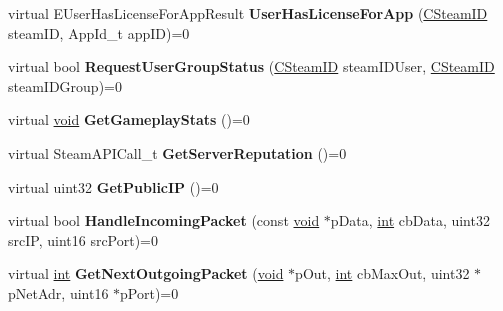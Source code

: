 \begin{DoxyCompactItemize}
\item 
\hypertarget{classISteamGameServer_add3a59d9012302094cf0fa6e58df68b9}{}virtual E\+User\+Has\+License\+For\+App\+Result {\bfseries User\+Has\+License\+For\+App} (\hyperlink{classCSteamID}{C\+Steam\+I\+D} steam\+I\+D, App\+Id\+\_\+t app\+I\+D)=0\label{classISteamGameServer_add3a59d9012302094cf0fa6e58df68b9}

\item 
\hypertarget{classISteamGameServer_a26660da8b7897075ac8d45b6c60a5fab}{}virtual bool {\bfseries Request\+User\+Group\+Status} (\hyperlink{classCSteamID}{C\+Steam\+I\+D} steam\+I\+D\+User, \hyperlink{classCSteamID}{C\+Steam\+I\+D} steam\+I\+D\+Group)=0\label{classISteamGameServer_a26660da8b7897075ac8d45b6c60a5fab}

\item 
\hypertarget{classISteamGameServer_a8700f90d3c1b911978db600d3f34c3db}{}virtual \hyperlink{SDL__audio_8h_a52835ae37c4bb905b903cbaf5d04b05f}{void} {\bfseries Get\+Gameplay\+Stats} ()=0\label{classISteamGameServer_a8700f90d3c1b911978db600d3f34c3db}

\item 
\hypertarget{classISteamGameServer_aea1658bc505a5caf2d9bd2c725bb0839}{}virtual Steam\+A\+P\+I\+Call\+\_\+t {\bfseries Get\+Server\+Reputation} ()=0\label{classISteamGameServer_aea1658bc505a5caf2d9bd2c725bb0839}

\item 
\hypertarget{classISteamGameServer_af47eae625782ed0d11e51c58774e5e6a}{}virtual uint32 {\bfseries Get\+Public\+I\+P} ()=0\label{classISteamGameServer_af47eae625782ed0d11e51c58774e5e6a}

\item 
\hypertarget{classISteamGameServer_a8923da7ae2b7a1cc178ec81f4f2d6cba}{}virtual bool {\bfseries Handle\+Incoming\+Packet} (const \hyperlink{SDL__audio_8h_a52835ae37c4bb905b903cbaf5d04b05f}{void} $\ast$p\+Data, \hyperlink{SDL__thread_8h_a6a64f9be4433e4de6e2f2f548cf3c08e}{int} cb\+Data, uint32 src\+I\+P, uint16 src\+Port)=0\label{classISteamGameServer_a8923da7ae2b7a1cc178ec81f4f2d6cba}

\item 
\hypertarget{classISteamGameServer_ae35b9006d3335c08b6c91260a7d7b32b}{}virtual \hyperlink{SDL__thread_8h_a6a64f9be4433e4de6e2f2f548cf3c08e}{int} {\bfseries Get\+Next\+Outgoing\+Packet} (\hyperlink{SDL__audio_8h_a52835ae37c4bb905b903cbaf5d04b05f}{void} $\ast$p\+Out, \hyperlink{SDL__thread_8h_a6a64f9be4433e4de6e2f2f548cf3c08e}{int} cb\+Max\+Out, uint32 $\ast$p\+Net\+Adr, uint16 $\ast$p\+Port)=0\label{classISteamGameServer_ae35b9006d3335c08b6c91260a7d7b32b}


\end{DoxyCompactItemize}
